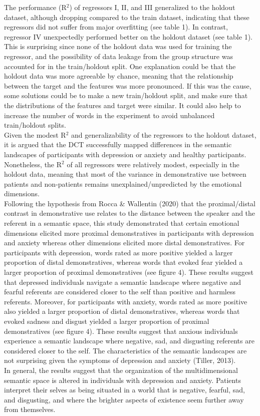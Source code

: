 \documentclass[11pt, a4paper]{article}
\begin{document}
The performance (R$^2$) of regressors I, II, and III generalized to the holdout dataset, although dropping compared to the train dataset, indicating that these regressors did not suffer from major overfitting (see table 1). In contrast, regressor IV unexpectedly performed better on the holdout dataset (see table 1). This is surprising since none of the holdout data was used for training the regressor, and the possibility of data leakage from the group structure was accounted for in the train/holdout split. One explanation could be that the holdout data was more agreeable by chance, meaning that the relationship between the target and the features was more pronounced. If this was the cause, some solutions could be to make a new train/holdout split, and make sure that the distributions of the features and target were similar. It could also help to increase the number of words in the experiment to avoid unbalanced train/holdout splits. \\
Given the modest R$^2$ and generalizability of the regressors to the holdout dataset, it is argued that the DCT successfully mapped differences in the semantic landscapes of participants with depression or anxiety and healthy participants. Nonetheless, the R$^2$ of all regressors were relatively modest, especially in the holdout data, meaning that most of the variance in demonstrative use between patients and non-patients remains unexplained/unpredicted by the emotional dimensions. \\

Following the hypothesis from Rocca \& Wallentin (2020) that the proximal/distal contrast in demonstrative use relates to the distance between the speaker and the referent in a semantic space, this study demonstrated that certain emotional dimensions elicited more proximal demonstratives in participants with depression and anxiety whereas other dimensions elicited more distal demonstratives. For participants with depression, words rated as more positive yielded a larger proportion of distal demonstratives, whereas words that evoked fear yielded a larger proportion of proximal demonstratives (see figure 4). These results suggest that depressed individuals navigate a semantic landscape where negative and fearful referents are considered closer to the self than positive and harmless referents. Moreover, for participants with anxiety, words rated as more positive also yielded a larger proportion of distal demonstratives, whereas words that evoked sadness and disgust yielded a larger proportion of proximal demonstratives (see figure 4). These results suggest that anxious individuals experience a semantic landscape where negative, sad, and disgusting referents are considered closer to the self. The characteristics of the semantic landscapes are not surprising given the symptoms of depression and anxiety (Tiller, 2013). \\
In general, the results suggest that the organization of the multidimensional semantic space is altered in individuals with depression and anxiety. Patients interpret their selves as being situated in a world that is negative, fearful, sad, and disgusting, and where the brighter aspects of existence seem further away from themselves.   
\end{document}
